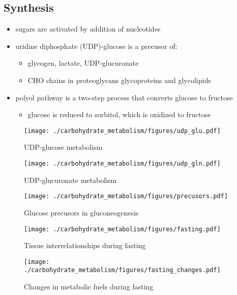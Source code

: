 \documentclass{scrartcl}
\begin{document}
\subsection{Synthesis}
\label{sec:orgc75017f}
\begin{itemize}
\item sugars are activated by addition of nucleotides
\item uridine diphosphate (UDP)-glucose is a precusor of:
\begin{itemize}
\item glycogen, lactate, UDP-glucuronate
\item CHO chains in proteoglycans glycoproteins and glycolipids
\end{itemize}
\item polyol pathway is a two-step process that converts glucose to
fructose
\begin{itemize}
\item glucose is reduced to sorbitol, which is oxidized to fructose
\end{itemize}
\end{itemize}

\begin{figure}[htbp]
\centering
\texttt{[image: ./carbohydrate\_metabolism/figures/udp\_glu.pdf]}
\caption{\label{fig:orgd731260}
UDP-glucose metabolism}
\end{figure}

\begin{figure}[htbp]
\centering
\texttt{[image: ./carbohydrate\_metabolism/figures/udp\_gln.pdf]}
\caption{\label{fig:org75d1446}
UDP-glucuronate metabolism}
\end{figure}

\begin{figure}[htbp]
\centering
\texttt{[image: ./carbohydrate\_metabolism/figures/precusors.pdf]}
\caption{\label{fig:org36fae06}
Glucose precusors in gluconeogenesis}
\end{figure}


\begin{figure}[htbp]
\centering
\texttt{[image: ./carbohydrate\_metabolism/figures/fasting.pdf]}
\caption{\label{fig:orgf3b28d6}
Tissue interrelationships during fasting}
\end{figure}


\begin{figure}[htbp]
\centering
\texttt{[image: ./carbohydrate\_metabolism/figures/fasting\_changes.pdf]}
\caption{\label{fig:org198df23}
Changes in metabolic fuels during fasting}
\end{figure}
\end{document}
